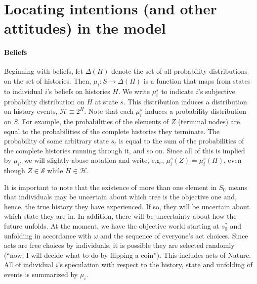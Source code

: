 \documentclass[
11pt,
titlepage,
reqno,
]{article}%
\theoremstyle{definition}
\begin{document}
	
\section{Locating intentions (and other attitudes) in the model\label{sec:attitudes}}

\paragraph{Beliefs \label{para: beliefs}}
	Beginning with beliefs, let $\Delta(H)$ denote the set of all probability distributions on the set of histories. 
	Then,  $\mu_i:S\rightarrow \Delta(H)$ is a function that maps from states to individual $i$'s beliefs on histories $H$. 
	We write  $\mu_i^s$ to indicate $i$'s subjective probability distribution on $H$ at state $s$.
	This distribution induces a distribution on history events, $\mathcal{H}\equiv 2^H$. 
	Note that each $\mu_i^s$ induces a probability distribution on $S$.
	For example, the probabilities of the elements of $Z$ (terminal nodes) are equal to the probabilities of the complete histories they terminate. 
	The probability of some arbitrary state $s_t$ is equal to the sum of the probabilities of the complete histories running through it, and so on.
	Since all of this is implied by $\mu_i$, we will slightly abuse notation and write, e.g.,  $\mu_i^s(Z)=\mu_i^s(H)$, even though $Z\in \mathcal{S}$ while $H\in \mathcal{H}$.
	
	It is important to note that the existence of more than one element in $S_0$ means that individuals may be uncertain about which tree is the objective one and, hence, the true history they have experienced. 
	If so, they will be uncertain about which state they are in. 
	In addition, there will be uncertainty about how the future unfolds. 
	At the moment, we have the objective world starting at $s_0^\ast$ and unfolding in accordance with $\omega$ and the sequence of everyone's act choices. 
	Since  acts are free choices by individuals, it is possible they are selected randomly (``now, I will decide what to do by flipping a coin'').
	This includes acts of Nature.
	All of individual $i$'s speculation with respect to the history, state and unfolding of events is summarized by $\mu_i$.
\end{document}
